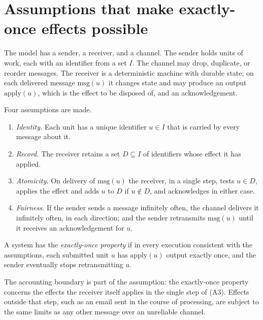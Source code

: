 \section{Assumptions that make exactly-once effects possible}

The model has a sender, a receiver, and a channel. The sender holds units of work, each with an identifier from a set $I$. The channel may drop, duplicate, or reorder messages. The receiver is a deterministic machine with durable state; on each delivered message $\mathrm{msg}(u)$ it changes state and may produce an output $\mathrm{apply}(u)$, which is the effect to be disposed of, and an acknowledgement.

\begin{definition}\label{def:exactly-once}
Four assumptions are made.
\begin{enumerate}[nosep,label=(A\arabic*)]
  \item \emph{Identity.} Each unit has a unique identifier $u\in I$ that is carried by every message about it.
  \item \emph{Record.} The receiver retains a set $D\subseteq I$ of identifiers whose effect it has applied.
  \item \emph{Atomicity.} On delivery of $\mathrm{msg}(u)$ the receiver, in a single step, tests $u\in D$, applies the effect and adds $u$ to $D$ if $u\notin D$, and acknowledges in either case.
  \item \emph{Fairness.} If the sender sends a message infinitely often, the channel delivers it infinitely often, in each direction; and the sender retransmits $\mathrm{msg}(u)$ until it receives an acknowledgement for $u$.
\end{enumerate}
A system has the \emph{exactly-once property} if in every execution consistent with the assumptions, each submitted unit $u$ has $\mathrm{apply}(u)$ output exactly once, and the sender eventually stops retransmitting $u$.
\end{definition}

The accounting boundary is part of the assumption: the exactly-once property concerns the effects the receiver itself applies in the single step of (A3). Effects outside that step, such as an email sent in the course of processing, are subject to the same limits as any other message over an unreliable channel.

